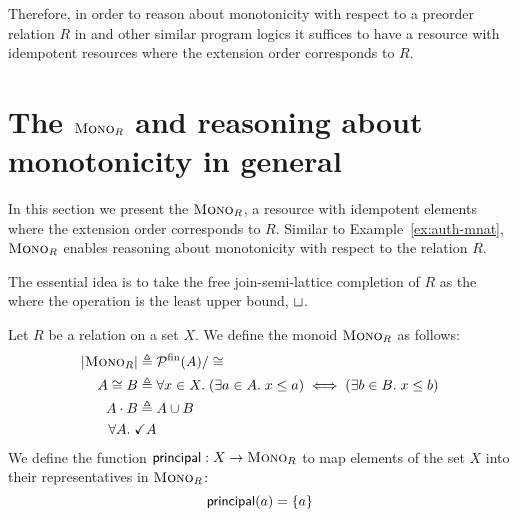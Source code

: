 \documentclass{scrartcl}
\begin{document}
Therefore, in order to reason about monotonicity with respect to a
preorder relation $R$ in \Iris{} and other similar program logics it
suffices to have a resource with idempotent resources where the
extension order corresponds to $R$.

\section{The $\textsc{Mono}_{R}$ \PCM{} and reasoning about monotonicity in
  general}
In this section we present the \PCM{} $\textsc{Mono}_{R}$, a resource with
idempotent elements where the extension order corresponds to
$R$. Similar to Example~\ref{ex:auth-mnat}, $\textsc{Mono}_{R}$ enables
reasoning about monotonicity with respect to the relation $R$.

The essential idea is to take the free join-semi-lattice completion of
$R$ as the \PCM{} where the operation is the least upper bound,
$\sqcup$.

\begin{definition}
  Let $R$ be a relation on a set $X$. We define the monoid $\textsc{Mono}_{R}$
  as follows:
\begin{align*}
  |\textsc{Mono}_{R}| \triangleq{}& \mathcal{P}^{\mathrm{fin}}(A)/\cong\\
  A \cong B \triangleq{}& \forall x \in X.\; (\exists a \in A.\; x \le a) \iff (\exists b \in B.\; x \le b)\\
  A \cdot B \triangleq{} & A \cup B\\
  \forall A.\; \checkmark{A}
\end{align*}
We define the function $\mathsf{principal} : X \to \textsc{Mono}_{R}$ to map elements
of the set $X$ into their representatives in $\textsc{Mono}_{R}$:
\[ \mathsf{principal}(a) = \left\{a\right\} \]
\end{definition}
\end{document}
